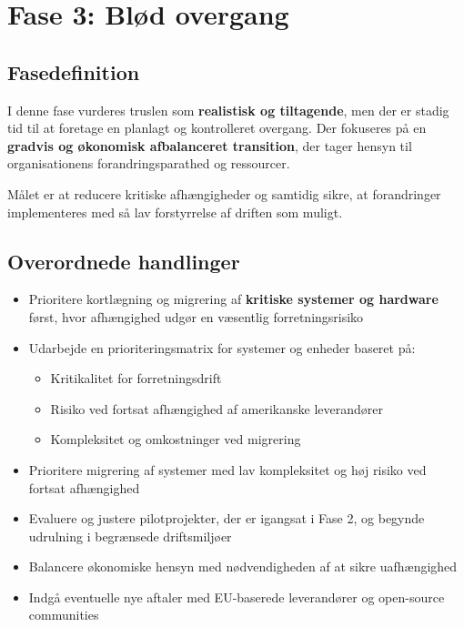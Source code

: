 \documentclass[a4paper,11pt]{book}
\begin{document}
\newpage

\chapter{Fase 3: Blød overgang}\label{fase-3-bluxf8d-overgang}

\section{Fasedefinition}\label{fasedefinition}

I denne fase vurderes truslen som \textbf{realistisk og tiltagende}, men
der er stadig tid til at foretage en planlagt og kontrolleret overgang.
Der fokuseres på en \textbf{gradvis og økonomisk afbalanceret
transition}, der tager hensyn til organisationens forandringsparathed og
ressourcer.

Målet er at reducere kritiske afhængigheder og samtidig sikre, at
forandringer implementeres med så lav forstyrrelse af driften som
muligt.

\section{Overordnede handlinger}\label{overordnede-handlinger}

\begin{itemize}
\item
  Prioritere kortlægning og migrering af \textbf{kritiske systemer og
  hardware} først, hvor afhængighed udgør en væsentlig forretningsrisiko
\item
  Udarbejde en prioriteringsmatrix for systemer og enheder baseret på:

  \begin{itemize}
  \tightlist
  \item
    Kritikalitet for forretningsdrift
  \item
    Risiko ved fortsat afhængighed af amerikanske leverandører
  \item
    Kompleksitet og omkostninger ved migrering
  \end{itemize}
\item
  Prioritere migrering af systemer med lav kompleksitet og høj risiko
  ved fortsat afhængighed
\item
  Evaluere og justere pilotprojekter, der er igangsat i Fase 2, og
  begynde udrulning i begrænsede driftsmiljøer
\item
  Balancere økonomiske hensyn med nødvendigheden af at sikre
  uafhængighed
\item
  Indgå eventuelle nye aftaler med EU-baserede leverandører og
  open-source communities
\end{itemize}
\end{document}

